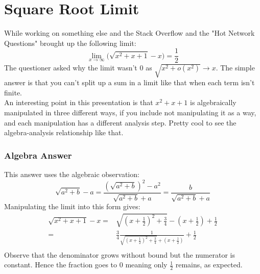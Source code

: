 
\section{Square Root Limit}
\label{showcase:sqrt_limit}
While working on something else and the Stack Overflow and the "Hot Network Questions" brought up the following limit:
\[\lim_{x\rightarrow \infty} \bigg(\sqrt{x^2+x+1} - x\bigg) = \frac{1}{2}\]
The questioner asked why the limit wasn't $0$ as $\sqrt{x^2+o(x^2)}\rightarrow x$.
The simple answer is that you can't split up a sum in a limit like that when each term isn't finite.
\\

An interesting point in this presentation is that $x^2+x+1$ is algebraically manipulated in three different ways, 
if you include not manipulating it as a way,
and each manipulation has a different analysis step.
Pretty cool to see the algebra-analysis relationship like that.

\subsubsection{Algebra Answer}
This answer uses the algebraic observation:
\[\sqrt{a^2+b}-a =\frac{(\sqrt{a^2+b})^2-a^2}{\sqrt{a^2+b}+a}=\frac{b}{\sqrt{a^2+b}+a}\]
Manipulating the limit into this form gives:
\begin{equation*}
\begin{aligned}
\sqrt{x^2+x+1} - x=& \sqrt{\left(x+\frac{1}{2}\right)^2+\frac{3}{4}}-\left(x+\frac{1}{2}\right)+\frac{1}{2}\\
=&\frac{3}{4}\frac{1}{\sqrt{\left(x+\frac{1}{2}\right)^2+\frac{3}{4}}+\left(x+\frac{1}{2}\right)}+\frac{1}{2}\\
\end{aligned}
\end{equation*}
Observe that the denominator grows without bound but the numerator is constant.
Hence the fraction goes to $0$ meaning only $\frac{1}{2}$ remains, 
as expected.

